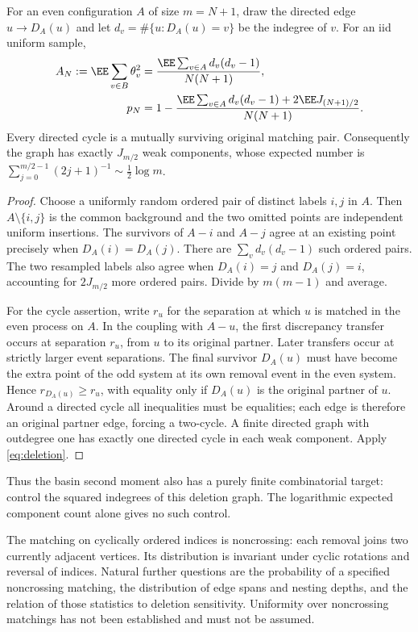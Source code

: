 \documentclass[11pt,letterpaper]{article}
\begin{document}
\begin{proposition}\label{prop:deletion-graph}
For an even configuration $A$ of size $m=N+1$, draw the directed edge
$u\longrightarrow D_A(u)$ and let
$d_v=\#\{u:D_A(u)=v\}$ be the indegree of $v$. For an iid uniform sample,
\begin{align}
 A_N:=\EE\sum_{v\in B}\theta_v^2
 &=\frac{\EE\sum_{v\in A}d_v(d_v-1)}{N(N+1)},\label{eq:indegree}\\
 p_N&=1-\frac{\EE\sum_{v\in A}d_v(d_v-1)+2\EE J_{(N+1)/2}}
 {N(N+1)}.\label{eq:graph-noise}
\end{align}
Every directed cycle is a mutually surviving original matching pair.
Consequently the graph has exactly $J_{m/2}$ weak components, whose
expected number is $\sum_{j=0}^{m/2-1}(2j+1)^{-1}\sim\tfrac12\log m$.
\end{proposition}
\begin{proof}
Choose a uniformly random ordered pair of distinct labels $i,j$ in $A$.
Then $A\setminus\{i,j\}$ is the common background and the two omitted
points are independent uniform insertions. The survivors of $A-i$ and
$A-j$ agree at an existing point precisely when $D_A(i)=D_A(j)$.
There are $\sum_v d_v(d_v-1)$ such ordered pairs. The two resampled labels
also agree when $D_A(i)=j$ and $D_A(j)=i$, accounting for $2J_{m/2}$ more
ordered pairs. Divide by $m(m-1)$ and average.

For the cycle assertion, write $r_u$ for the separation at which $u$ is
matched in the even process on $A$. In the coupling with $A-u$, the first
discrepancy transfer occurs at separation $r_u$, from $u$ to its original
partner. Later transfers occur at strictly larger event separations. The
final survivor $D_A(u)$ must have become the extra point of the odd system
at its own removal event in the even system. Hence
$r_{D_A(u)}\ge r_u$, with equality only if $D_A(u)$ is the original
partner of $u$. Around a directed cycle all inequalities must be equalities;
each edge is therefore an original partner edge, forcing a two-cycle.
A finite directed graph with outdegree one has exactly one directed cycle
in each weak component. Apply \eqref{eq:deletion}.
\end{proof}

Thus the basin second moment also has a purely finite combinatorial target:
control the squared indegrees of this deletion graph. The logarithmic
expected component count alone gives no such control.

The matching on cyclically ordered indices is noncrossing: each removal
joins two currently adjacent vertices. Its distribution is invariant under
cyclic rotations and reversal of indices. Natural further questions are
the probability of a specified noncrossing matching, the distribution of
edge spans and nesting depths, and the relation of those statistics to
deletion sensitivity. Uniformity over noncrossing matchings has not been
established and must not be assumed.
\end{document}

